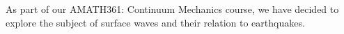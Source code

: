 \chapter{}
As part of our AMATH361: Continuum Mechanics course, we have decided to explore the subject of surface waves and their relation to earthquakes.
